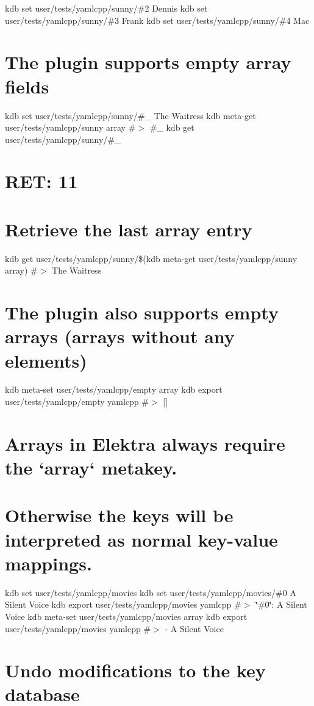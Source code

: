kdb set user/tests/yamlcpp/sunny/\#2 Dennis kdb set user/tests/yamlcpp/sunny/\#3 Frank kdb set user/tests/yamlcpp/sunny/\#4 Mac\hypertarget{autotoc_md865_autotoc_md886}{}\section{The plugin supports empty array fields}\label{autotoc_md865_autotoc_md886}
kdb set user/tests/yamlcpp/sunny/\#\+\_ \textquotesingle{}The Waitress\textquotesingle{} kdb meta-\/get user/tests/yamlcpp/sunny array \#$>$ \#\+\_ kdb get user/tests/yamlcpp/sunny/\#\+\_ \hypertarget{autotoc_md865_autotoc_md887}{}\section{R\+E\+T\+: 11}\label{autotoc_md865_autotoc_md887}
\hypertarget{autotoc_md865_autotoc_md888}{}\section{Retrieve the last array entry}\label{autotoc_md865_autotoc_md888}
kdb get user/tests/yamlcpp/sunny/\$(kdb meta-\/get user/tests/yamlcpp/sunny array) \#$>$ The Waitress\hypertarget{autotoc_md865_autotoc_md889}{}\section{The plugin also supports empty arrays (arrays without any elements)}\label{autotoc_md865_autotoc_md889}
kdb meta-\/set user/tests/yamlcpp/empty array \textquotesingle{}\textquotesingle{} kdb export user/tests/yamlcpp/empty yamlcpp \#$>$ \mbox{[}\mbox{]}\hypertarget{autotoc_md865_autotoc_md890}{}\section{Arrays in Elektra always require the `array` metakey.}\label{autotoc_md865_autotoc_md890}
\hypertarget{autotoc_md865_autotoc_md891}{}\section{Otherwise the keys will be interpreted as normal key-\/value mappings.}\label{autotoc_md865_autotoc_md891}
kdb set user/tests/yamlcpp/movies kdb set user/tests/yamlcpp/movies/\#0 \textquotesingle{}A Silent Voice\textquotesingle{} kdb export user/tests/yamlcpp/movies yamlcpp \#$>$ \char`\"{}\#0\char`\"{}\+: A Silent Voice kdb meta-\/set user/tests/yamlcpp/movies array \textquotesingle{}\textquotesingle{} kdb export user/tests/yamlcpp/movies yamlcpp \#$>$ -\/ A Silent Voice\hypertarget{autotoc_md865_autotoc_md892}{}\section{Undo modifications to the key database}\label{autotoc_md865_autotoc_md892}
